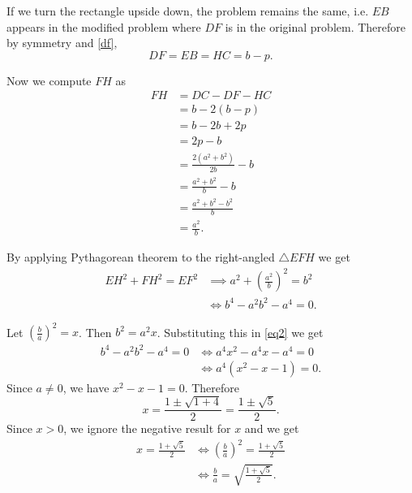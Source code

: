 \documentclass{article}
\begin{document}
If we turn the rectangle upside down, the problem remains the same, i.e.
\( EB \) appears in the modified problem where \( DF \) is in the
original problem. Therefore by symmetry and \eqref{df},
\[
DF = EB = HC = b - p.
\]

Now we compute \( FH \) as
\begin{align*}
FH & = DC - DF - HC \\
   & = b - 2(b - p) \\
   & = b - 2b + 2p \\
   & = 2p - b \\
   & = \frac{2 \left( a^2 + b^2 \right)}{2b} - b \\
   & = \frac{a^2 + b^2}{b} - b \\
   & = \frac{a^2 + b^2 - b^2}{b} \\
   & = \frac{a^2}{b}.
\end{align*}

By applying Pythagorean theorem to the right-angled \( \triangle EFH \)
we get
\begin{align}
EH^2 + FH^2 = EF^2 & \implies a^2 + \left( \frac{a^2}{b} \right)^2 = b^2
                     \nonumber \\
                   & \iff b^4 - a^2 b^2 - a^4 = 0.
                     \label{eq2}
\end{align}

Let \( \left( \frac{b}{a} \right)^2 = x \). Then \( b^2 = a^2 x \).
Substituting this in \eqref{eq2} we get
\begin{align*}
b^4 - a^2 b^2 - a^4 = 0 & \iff a^4 x^2 - a^4 x - a^4 = 0 \\
                        & \iff a^4 (x^2 - x - 1) = 0.
\end{align*}
Since \( a \neq 0 \), we have \( x^2 - x - 1 = 0 \). Therefore
\[
x = \frac{1 \pm \sqrt{1 + 4}}{2} = \frac{1 \pm \sqrt{5}}{2}.
\]
Since \( x > 0 \), we ignore the negative result for \( x \) and we get
\begin{align*}
x = \frac{1 + \sqrt{5}}{2}
& \iff \left( \frac{b}{a} \right)^2 = \frac{1 + \sqrt{5}}{2} \\
& \iff \frac{b}{a} = \sqrt{\frac{1 + \sqrt{5}}{2}}.
\end{align*}
\end{document}
